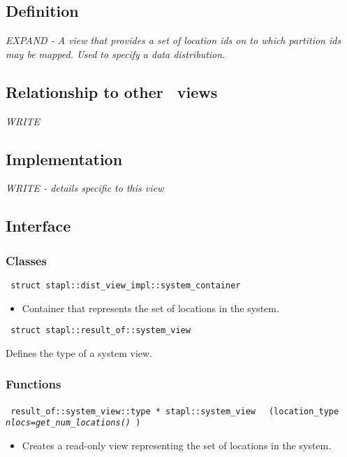 \subsection{Definition}

\textit{EXPAND - A view that provides a set of location ids on to which partition ids may be mapped.  Used to specify a data distribution.}

\subsection{Relationship to other \stapl\ views}

\textit{WRITE}

\subsection{Implementation}

\textit{WRITE - details specific to this view}

\subsection{Interface} \label{sec-dist-sys-vw-inter}

\subsubsection{Classes}
\noindent

\texttt{%
struct stapl::dist\_view\_impl::system\_container
}

\begin{itemize}
\item
Container that represents the set of locations in the system.
\end{itemize}

\noindent
\texttt{%
struct stapl::result\_of::system\_view
}

Defines the type of a system view.

\subsubsection{Functions}

\noindent
\texttt{%
result\_of::system\_view::type * stapl::system\_view
}
\texttt{%
    (location\_type
\textit{nlocs=get\_num\_locations()}%
)
}

\begin{itemize}
\item
Creates a read-only view representing the set of locations in the system. 
\end{itemize}

